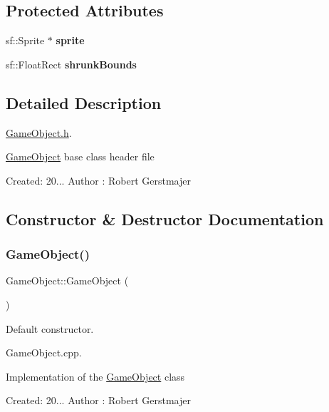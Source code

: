 \subsection*{Protected Attributes}
\begin{DoxyCompactItemize}
\item 
\mbox{\label{class_game_object_ac965ec6e2eba11bb1be2ecba57508329}} 
sf\+::\+Sprite $\ast$ {\bfseries sprite}
\item 
\mbox{\label{class_game_object_a8cadf697830d86c59f4a193ad70b17b2}} 
sf\+::\+Float\+Rect {\bfseries shrunk\+Bounds}
\end{DoxyCompactItemize}


\subsection{Detailed Description}
\mbox{\hyperlink{_game_object_8h_source}{Game\+Object.\+h}}. 

\mbox{\hyperlink{class_game_object}{Game\+Object}} base class header file

Created\+: 20... Author \+: Robert Gerstmajer 

\subsection{Constructor \& Destructor Documentation}
\mbox{\label{class_game_object_a0348e3ee2e83d56eafca7a3547f432c4}} 
\subsubsection{\texorpdfstring{Game\+Object()}{GameObject()}}
{\footnotesize\ttfamily Game\+Object\+::\+Game\+Object (\begin{DoxyParamCaption}{ }\end{DoxyParamCaption})}



Default constructor. 

Game\+Object.\+cpp.

Implementation of the \mbox{\hyperlink{class_game_object}{Game\+Object}} class

Created\+: 20... Author \+: Robert Gerstmajer 

